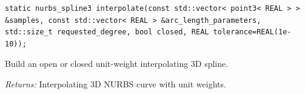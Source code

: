 \par\noindent\begin{minipage}{\linewidth}
\begin{lstlisting}[style=apireference]
static nurbs_spline3 interpolate(const std::vector< point3< REAL > > &samples, const std::vector< REAL > &arc_length_parameters, std::size_t requested_degree, bool closed, REAL tolerance=REAL(1e-10));
\end{lstlisting}
{\footnotesize Build an open or closed unit-weight interpolating 3D spline.\par}
{\footnotesize\textit{Returns:} Interpolating 3D NURBS curve with unit weights.\par}
\end{minipage}\par\vspace{1pt}
